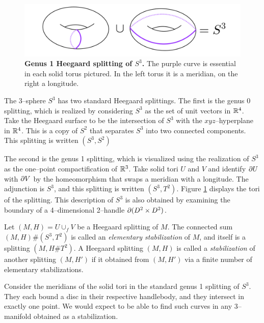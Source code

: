 \begin{figure}[h!]
	\centering
	\includegraphics[width=\textwidth]{figures/genus-1-split.png}
	\caption{
		\textbf{Genus 1 Heegaard splitting of $S^3$.}
		The purple curve is essential in each solid torus pictured.
		In the left torus it is a meridian, on the right a longitude.
	}
	\label{fig:genus-1-split}
\end{figure}

\begin{ex}
	The 3--sphere $S^3$ has two standard Heegaard splittings.
	The first is the genus 0 splitting, which is realized by considering $S^3$ as the set of unit vectors in $\mathbb{R}^4$.
	Take the Heegaard surface to be the intersection of $S^3$ with the $xyz$--hyperplane in $\mathbb{R}^4$.
	This is a copy of $S^2$ that separates $S^3$ into two connected components.
	This splitting is written $(S^3,S^2)$
	
	The second is the genus 1 splitting, which is visualized using the realization of $S^3$ as the one--point compactification of $\mathbb{R}^3$.
	Take solid tori $U$ and $V$ and identify $\partial U$ with $\partial V$ by the homeomorphism that swaps a meridian with a longitude.
	The adjunction is $S^3$, and this splitting is written $(S^3,T^2)$.
	Figure \ref{fig:genus-1-split} displays the tori of the splitting.
	This description of $S^3$ is also obtained by examining the boundary of a 4--dimensional 2--handle $\partial (D^2\times D^2)$.
\end{ex}

\begin{defn}
	Let $(M,H)=U\cup_f V$ be a Heegaard splitting of $M$.
	The connected sum $(M,H)\#(S^3,T^2)$ is called an \emph{elementary stabilization} of $M$, and itself is a splitting $(M,H\#T^2)$.
	A Heegaard splitting $(M,H)$ is called a \emph{stabilization} of another splitting $(M,H')$ if it obtained from $(M,H')$ via a finite number of elementary stabilizations.
\end{defn}

Consider the meridians of the solid tori in the standard genus 1 splitting of $S^3$.
They each bound a disc in their respective handlebody, and they intersect in exactly one point.
We would expect to be able to find such curves in any 3--manifold obtained as a stabilization.

